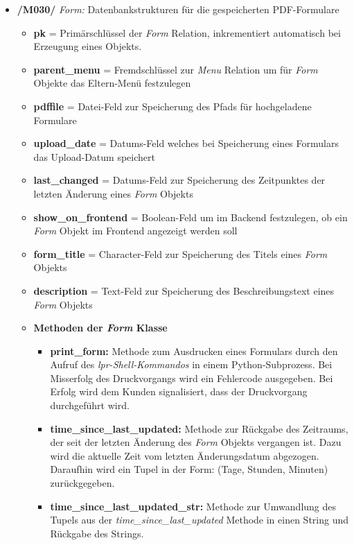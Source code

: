 \begin{itemize}
    \item \textbf{/M030/} \textit{Form:} Datenbankstrukturen für die gespeicherten PDF-Formulare
    \begin{itemize}
        \item \textbf{pk} = Primärschlüssel der \textit{Form} Relation, inkrementiert automatisch bei Erzeugung eines Objekts.
        \item \textbf{parent\_menu} = Fremdschlüssel zur \textit{Menu} Relation um für \textit{Form} Objekte das Eltern-Menü festzulegen
        \item \textbf{pdffile} = Datei-Feld zur Speicherung des Pfads für hochgeladene Formulare
        \item \textbf{upload\_date} = Datums-Feld welches bei Speicherung eines Formulars das Upload-Datum speichert
        \item \textbf{last\_changed} = Datums-Feld zur Speicherung des Zeitpunktes der letzten Änderung eines \textit{Form} Objekts
        \item \textbf{show\_on\_frontend} = Boolean-Feld um im Backend festzulegen, ob ein \textit{Form} Objekt im Frontend angezeigt werden soll
        \item \textbf{form\_title} = Character-Feld zur Speicherung des Titels eines \textit{Form} Objekts
        \item \textbf{description} = Text-Feld zur Speicherung des Beschreibungstext eines \textit{Form} Objekts
    \end{itemize}
    \begin{itemize}
    \newpage
        \item \textbf{Methoden der \textit{Form} Klasse}
        \begin{itemize}
            \item \textbf{print\_form:} Methode zum Ausdrucken eines Formulars durch den Aufruf des \textit{lpr-Shell-Kommandos} in einem Python-Subprozess. Bei Misserfolg des Druckvorgangs wird ein Fehlercode ausgegeben. Bei Erfolg wird dem Kunden signalisiert, dass der Druckvorgang durchgeführt wird.
            \item \textbf{time\_since\_last\_updated:} Methode zur Rückgabe des Zeitraums, der seit der letzten Änderung des \textit{Form} Objekts vergangen ist. Dazu wird die aktuelle Zeit vom letzten Änderungsdatum abgezogen. Daraufhin wird ein Tupel in der Form: (Tage, Stunden, Minuten) zurückgegeben.
            \item \textbf{time\_since\_last\_updated\_str:} Methode zur Umwandlung des Tupels aus der \textit{time\_since\_last\_updated} Methode in einen String und Rückgabe des Strings.
        \end{itemize}
    \end{itemize}
\end{itemize}


